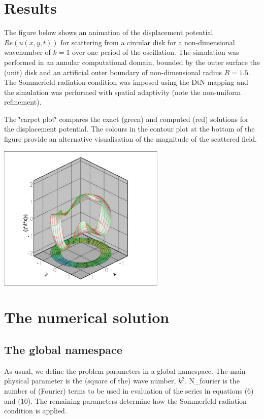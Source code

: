 \hypertarget{index_results}{}\section{Results}\label{index_results}
The figure below shows an animation of the displacement potential $ Re(u(x,y,t)) $ for scattering from a circular disk for a non-\/dimensional wavenumber of $ k=1 $ over one period of the oscillation. The simulation was performed in an annular computational domain, bounded by the outer surface the (unit) disk and an artificial outer boundary of non-\/dimensional radius $ R=1.5. $ The Sommerfeld radiation condition was imposed using the DtN mapping and the simulation was performed with spatial adaptivity (note the non-\/uniform refinement).

The \char`\"{}carpet plot\char`\"{} compares the exact (green) and computed (red) solutions for the displacement potential. The colours in the contour plot at the bottom of the figure provide an alternative visualisation of the magnitude of the scattered field.

 
\begin{DoxyImage}
\includegraphics[width=0.6\textwidth]{scattering_animation}
\end{DoxyImage}




 

\hypertarget{index_num_soln}{}\section{The numerical solution}\label{index_num_soln}
\hypertarget{index_namespace}{}\subsection{The global namespace}\label{index_namespace}
As usual, we define the problem parameters in a global namespace. The main physical parameter is the (square of the) wave number, $ k^2 $. {\ttfamily N\+\_\+fourier} is the number of (Fourier) terms to be used in evaluation of the series in equations (6) and (10). The remaining parameters determine how the Sommerfeld radiation condition is applied.

